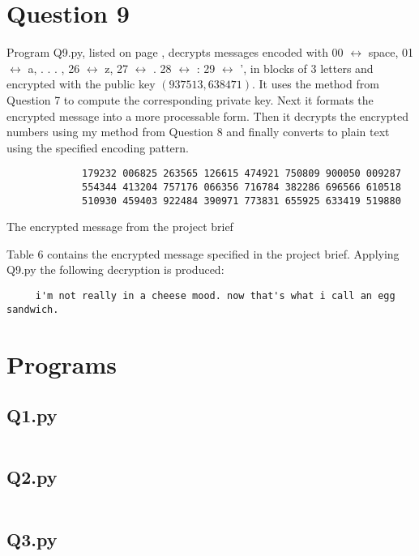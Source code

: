 \documentclass[a4paper]{article}
\begin{document}
\section*{Question 9}
Program Q9.py, listed on page \pageref{PQ9}, decrypts messages encoded with 00 $\leftrightarrow$ space, 01 $\leftrightarrow$ a, . . . , 26 $\leftrightarrow$ z, 27 $\leftrightarrow$ . 28 $\leftrightarrow$ : 29 $\leftrightarrow$ ', in blocks of 3 letters and encrypted with the public key $(937513,638471)$.
\bigbreak
It uses the method from Question 7 to compute the corresponding private key. Next it formats the encrypted message into a more processable form. Then it decrypts the encrypted numbers using my method from Question 8 and finally converts to plain text using the specified encoding pattern.
\begin{table}[H]
\centering
\begin{verbatim}
             179232 006825 263565 126615 474921 750809 900050 009287
             554344 413204 757176 066356 716784 382286 696566 610518
             510930 459403 922484 390971 773831 655925 633419 519880
\end{verbatim}
\caption{The encrypted message from the project brief}
\end{table}

Table 6 contains the encrypted message specified in the project brief. Applying Q9.py the following decryption is produced: \\
\begin{verbatim}
     i'm not really in a cheese mood. now that's what i call an egg sandwich.
\end{verbatim}

\pagebreak
\section*{Programs}

\subsection*{Q1.py}\label{PQ1}
\inputminted[frame=single,linenos,framesep=2mm,baselinestretch=1.2]{python}{Q1.py}

\subsection*{Q2.py}\label{PQ2}
\inputminted[frame=single,linenos,framesep=2mm,baselinestretch=1.2]{python}{Q2.py}

\pagebreak
\subsection*{Q3.py}\label{PQ3}
\inputminted[frame=single,linenos,framesep=2mm,baselinestretch=1.2]{python}{Q3.py}
\end{document}
